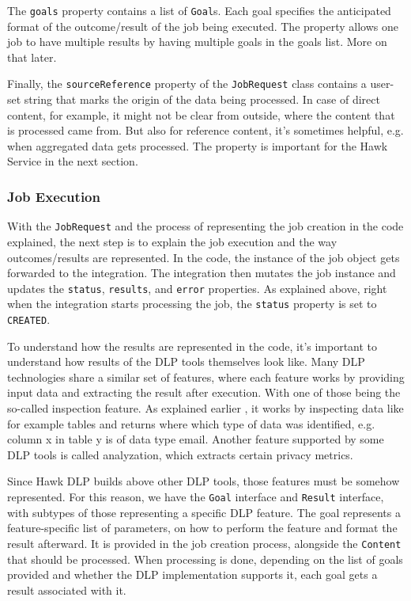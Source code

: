 The \texttt{goals} property contains a list of \texttt{Goal}s. Each goal specifies the anticipated format of the outcome/result of the job being executed. The property allows one job to have multiple results by having multiple goals in the goals list. More on that later.

Finally, the \texttt{sourceReference} property of the \texttt{JobRequest} class contains a user-set string that marks the origin of the data being processed. In case of direct content, for example, it might not be clear from outside, where the content that is processed came from. But also for reference content, it's sometimes helpful, e.g. when aggregated data gets processed. The property is important for the Hawk Service in the next section.

\subsubsection{Job Execution}

With the \texttt{JobRequest} and the process of representing the job creation in the code explained, the next step is to explain the job execution and the way outcomes/results are represented. In the code, the instance of the job object gets forwarded to the integration. The integration then mutates the job instance and updates the \texttt{status}, \texttt{results}, and \texttt{error} properties. As explained above, right when the integration starts processing the job, the \texttt{status} property is set to \texttt{CREATED}.

To understand how the results are represented in the code, it's important to understand how results of the DLP tools themselves look like. Many DLP technologies share a similar set of features, where each feature works by providing input data and extracting the result after execution. With one of those being the so-called inspection feature. As explained earlier , it works by inspecting data like for example tables and returns where which type of data was identified, e.g. column x in table y is of data type email. Another feature supported by some DLP tools is called analyzation, which extracts certain privacy metrics.

Since Hawk DLP builds above other DLP tools, those features must be somehow represented. For this reason, we have the \texttt{Goal} interface and \texttt{Result} interface, with subtypes of those representing a specific DLP feature. The goal represents a feature-specific list of parameters, on how to perform the feature and format the result afterward. It is provided in the job creation process, alongside the \texttt{Content} that should be processed. When processing is done, depending on the list of goals provided and whether the DLP implementation supports it, each goal gets a result associated with it.

